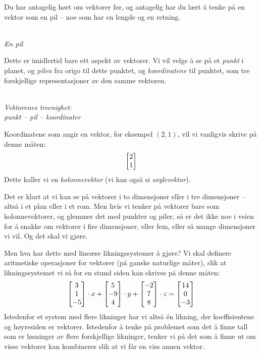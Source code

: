 Du har antagelig hørt om vektorer før, og antagelig har du lært å
tenke på en vektor som en pil -- noe som har en lengde og en retning.
\begin{center}
\\
{\small \textit{En pil}}
\end{center}
Dette er imidlertid bare ett aspekt av vektorer.  Vi vil velge å se på
et \emph{punkt} i planet, og \emph{pilen} fra origo til dette punktet, og
\emph{koordinatene} til punktet, som tre forskjellige representasjoner
av den samme vektoren.
\begin{center}
\\
{\small \textit{Vektorenes treenighet:\\punkt -- pil -- koordinater}}
\end{center}
Koordinatene som angir en vektor, for eksempel $(2,1)$, vil vi
vanligvis skrive på denne måten:
\[
\begin{bmatrix} 2 \\ 1 \end{bmatrix}
\]
Dette kaller vi en \emph{kolonnevektor} (vi kan også si
\emph{søylevektor}).

Det er klart at vi kan se på vektorer i to dimensjoner eller i tre
dimensjoner -- altså i et plan eller i et rom.  Men hvis vi tenker på
vektorer bare som kolonnevektorer, og glemmer det med punkter og
piler, så er det ikke noe i veien for å snakke om vektorer i fire
dimensjoner, eller fem, eller så mange dimensjoner vi vil.  Og det
skal vi gjøre.

Men hva har dette med lineære likningssystemer å gjøre?  Vi skal
definere aritmetiske operasjoner for vektorer (på ganske naturlige
måter), slik at likningssystemet vi så for en stund siden kan skrives
på denne måten:
\[
\begin{bmatrix} 3 \\ 1 \\ -5 \end{bmatrix} \cdot x + \begin{bmatrix} 5 \\ -9 \\ 4 \end{bmatrix} \cdot y + \begin{bmatrix} -2 \\ 7 \\ 8 \end{bmatrix} \cdot z = \begin{bmatrix} 14 \\ 0 \\ -3 \end{bmatrix}
\]
Istedenfor et system med flere likninger har vi altså én likning, der
koeffisientene og høyresiden er vektorer.  Istedenfor å tenke på
problemet som det å finne tall som er løsninger av flere forskjellige
likninger, tenker vi på det som å finne ut om visse vektorer kan
kombineres slik at vi får en viss annen vektor.

